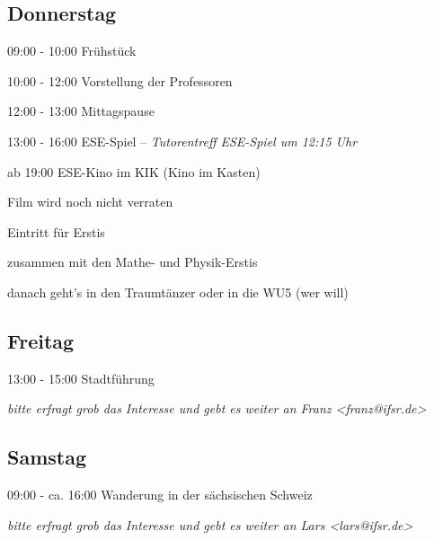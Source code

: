 \documentclass[a4paper,12pt]{report}
\begin{document}
\subsection{Donnerstag}
\begin{itemize*}
\item 09:00 - 10:00 Frühstück
\item 10:00 - 12:00 Vorstellung der Professoren
\item 12:00 - 13:00 Mittagspause
\item 13:00 - 16:00 ESE-Spiel -- \small{\textit{Tutorentreff ESE-Spiel um 12:15 Uhr}}
\item ab 19:00 ESE-Kino im KIK (Kino im Kasten)
\begin{itemize*}
	\item Film wird noch nicht verraten
	\item Eintritt für Erstis 
	\item zusammen mit den Mathe- und Physik-Erstis
	\item danach geht's in den Traumtänzer oder in die WU5 (wer will)
\end{itemize*}
\end{itemize*}

\subsection{Freitag}
\begin{itemize*}
\item 13:00 - 15:00 Stadtführung
\begin{itemize*}
  \item \small{\textit{bitte erfragt grob das Interesse und gebt es weiter an Franz <franz@ifsr.de>}}
\end{itemize*}
\end{itemize*}

\subsection{Samstag}
\begin{itemize*}
\item 09:00 - ca. 16:00 Wanderung in der sächsischen Schweiz
\begin{itemize*}
  \item \small{\textit{bitte erfragt grob das Interesse und gebt es weiter an Lars <lars@ifsr.de>}}
\end{itemize*}
\end{itemize*}
\end{document}
